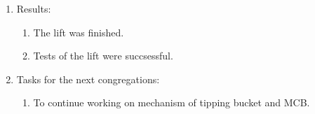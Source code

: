 \begin{enumerate}
\begin{enumerate}
    \end{enumerate}
    
	\item Results:  
	\begin{enumerate}
	  \item The lift was finished.
	  
	  \item Tests of the lift were succsessful.
	  
    \end{enumerate}
    
	\item Tasks for the next congregations:
	\begin{enumerate}
	  \item To continue working on mechanism of tipping bucket and MCB.
	  
    \end{enumerate}     
\end{enumerate}
\fillpage


